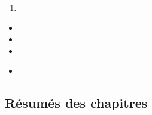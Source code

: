 \documentclass[12pt, titlepage, french]{report}
\begin{document}
\begin{distributions}[Objective]

\end{distributions}

\begin{outcomes}
\begin{enumerate}
	\item	
\end{enumerate}
\end{outcomes}

\begin{ASM_chapter}
\begin{itemize}
	\item	{}
	\item	{}
	\item	{}
\end{itemize}
\end{ASM_chapter}

\begin{YTB_vids}
\begin{itemize}
	\item	
\end{itemize}
\end{YTB_vids}

\subsection{Résumés des chapitres}
\end{document}
